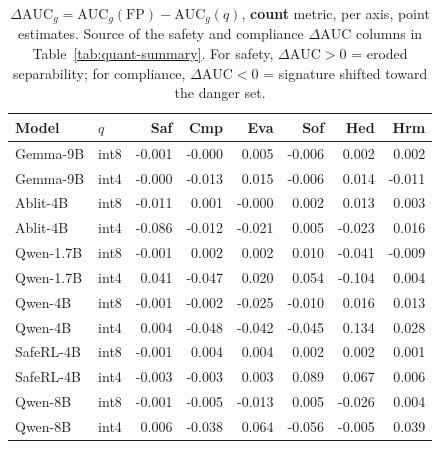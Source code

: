 \documentclass[10pt,twocolumn]{article}
\newcommand{\AUC}{\mathrm{AUC}}
\begin{document}
\begin{table}[p]
\centering\scriptsize
\setlength{\tabcolsep}{3pt}
\caption{$\Delta\AUC_g=\AUC_g(\mathrm{FP})-\AUC_g(q)$, \textbf{count} metric, per axis,
point estimates. Source of the safety and compliance $\Delta\AUC$ columns in
Table~\ref{tab:quant-summary}. For safety, $\Delta\AUC>0$ = eroded separability; for
compliance, $\Delta\AUC<0$ = signature shifted toward the danger set.}
\label{tab:dauc}
\begin{tabular}{@{}llrrrrrr@{}}
\toprule
Model & $q$ & Saf & Cmp & Eva & Sof & Hed & Hrm \\
\midrule
Gemma-9B  & int8 & -0.001 & -0.000 &  0.005 & -0.006 &  0.002 &  0.002 \\
Gemma-9B  & int4 & -0.000 & -0.013 &  0.015 & -0.006 &  0.014 & -0.011 \\
Ablit-4B  & int8 & -0.011 &  0.001 & -0.000 &  0.002 &  0.013 &  0.003 \\
Ablit-4B  & int4 & -0.086 & -0.012 & -0.021 &  0.005 & -0.023 &  0.016 \\
Qwen-1.7B & int8 & -0.001 &  0.002 &  0.002 &  0.010 & -0.041 & -0.009 \\
Qwen-1.7B & int4 &  0.041 & -0.047 &  0.020 &  0.054 & -0.104 &  0.004 \\
Qwen-4B   & int8 & -0.001 & -0.002 & -0.025 & -0.010 &  0.016 &  0.013 \\
Qwen-4B   & int4 &  0.004 & -0.048 & -0.042 & -0.045 &  0.134 &  0.028 \\
SafeRL-4B & int8 & -0.001 &  0.004 &  0.004 &  0.002 &  0.002 &  0.001 \\
SafeRL-4B & int4 & -0.003 & -0.003 &  0.003 &  0.089 &  0.067 &  0.006 \\
Qwen-8B   & int8 & -0.001 & -0.005 & -0.013 &  0.005 & -0.026 &  0.004 \\
Qwen-8B   & int4 &  0.006 & -0.038 &  0.064 & -0.056 & -0.005 &  0.039 \\
\bottomrule
\end{tabular}
\end{table}
\end{document}
